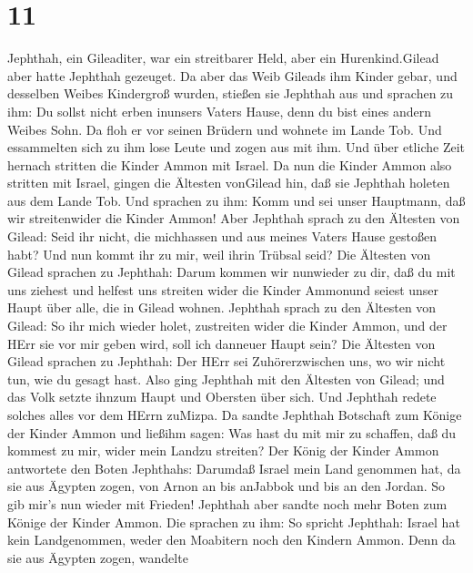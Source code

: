 \hypertarget{section-10}{%
\section{11}\label{section-10}}

 Jephthah, ein Gileaditer, war ein streitbarer Held, aber
ein Hurenkind.Gilead aber hatte Jephthah gezeuget.  Da aber
das Weib Gileads ihm Kinder gebar, und desselben Weibes Kindergroß
wurden, stießen sie Jephthah aus und sprachen zu ihm: Du sollst nicht
erben inunsers Vaters Hause, denn du bist eines andern Weibes Sohn.
 Da floh er vor seinen Brüdern und wohnete im Lande Tob. Und
essammelten sich zu ihm lose Leute und zogen aus mit ihm. 
Und über etliche Zeit hernach stritten die Kinder Ammon mit Israel.
 Da nun die Kinder Ammon also stritten mit Israel, gingen
die Ältesten vonGilead hin, daß sie Jephthah holeten aus dem Lande Tob.
 Und sprachen zu ihm: Komm und sei unser Hauptmann, daß wir
streitenwider die Kinder Ammon!  Aber Jephthah sprach zu den
Ältesten von Gilead: Seid ihr nicht, die michhassen und aus meines
Vaters Hause gestoßen habt? Und nun kommt ihr zu mir, weil ihrin Trübsal
seid?  Die Ältesten von Gilead sprachen zu Jephthah: Darum
kommen wir nunwieder zu dir, daß du mit uns ziehest und helfest uns
streiten wider die Kinder Ammonund seiest unser Haupt über alle, die in
Gilead wohnen.  Jephthah sprach zu den Ältesten von Gilead:
So ihr mich wieder holet, zustreiten wider die Kinder Ammon, und der
HErr sie vor mir geben wird, soll ich danneuer Haupt sein? 
Die Ältesten von Gilead sprachen zu Jephthah: Der HErr sei
Zuhörerzwischen uns, wo wir nicht tun, wie du gesagt hast. 
Also ging Jephthah mit den Ältesten von Gilead; und das Volk setzte
ihnzum Haupt und Obersten über sich. Und Jephthah redete solches alles
vor dem HErrn zuMizpa.  Da sandte Jephthah Botschaft zum
Könige der Kinder Ammon und ließihm sagen: Was hast du mit mir zu
schaffen, daß du kommest zu mir, wider mein Landzu streiten?
 Der König der Kinder Ammon antwortete den Boten Jephthahs:
Darumdaß Israel mein Land genommen hat, da sie aus Ägypten zogen, von
Arnon an bis anJabbok und bis an den Jordan. So gib mir's nun wieder mit
Frieden!  Jephthah aber sandte noch mehr Boten zum Könige
der Kinder Ammon.  Die sprachen zu ihm: So spricht
Jephthah: Israel hat kein Landgenommen, weder den Moabitern noch den
Kindern Ammon.  Denn da sie aus Ägypten zogen, wandelte
